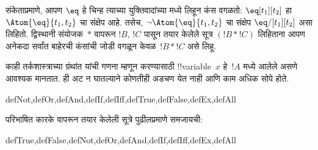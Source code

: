 \documentclass[../../../include/open-logic-section]{subfiles}
\begin{document}
संकेताप्रमाणे, आपण $\eq$ हे चिन्ह त्याच्या युक्तिवादांच्या मध्ये लिहून
कंस वगळतो: $\eq[t_1][t_2]$ हा $\Atom{\eq}{t_1,t_2}$ चा संक्षेप आहे.
तसेच, $\lnot \Atom{\eq}{t_1,t_2}$ चा संक्षेप $\eq/[t_1][t_2]$ असा
लिहितो. द्विस्थानी संयोजक~$\ast$ वापरून $!B$, $!C$ पासून तयार केलेले
सूत्र $(!B \ast !C)$ लिहिताना आपण अनेकदा सर्वांत बाहेरची कंसांची
जोडी वगळून केवळ~$!B \ast !C$ असे लिहू.

\begin{intro}
काही तर्कशास्त्राच्या ग्रंथांत
%
%
%
यांची गणना
 म्हणून करण्यासाठी
!!{variable}~$x$ हे~$!A$ मध्ये आलेले असणे आवश्यक मानतात. ही अट न
घातल्याने कोणतीही अडचण येत नाही आणि काम अधिक सोपे होते.
\end{intro}

\begin{tagblock}{defNot,defOr,defAnd,defIf,defIff,defTrue,defFalse,defEx,defAll}
\begin{defn}
परिभाषित कारके वापरून तयार केलेली सूत्रे पुढीलप्रमाणे समजायची:

\begin{tagenumerate}{defTrue,defFalse,defNot,defOr,defAnd,defIf,defIff,defEx,defAll}






%



\end{tagenumerate}
\end{defn}
\end{tagblock}
\end{document}
